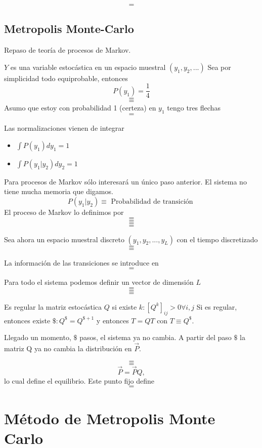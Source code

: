 \documentclass[10pt,oneside]{CBFT_book}
\begin{document}
\[=\]

\subsection{Metropolis Monte-Carlo}

Repaso de teoría de procesos de Markov.

$Y$ es una variable estocástica en un espacio muestral $(y_1, y_2,...)$
Sea por simplicidad todo equiprobable, entonces
\[
	P(y_1) = \frac{1}{4}
\]
\[=\]
\[=\]
Asumo que estoy con probabilidad 1 (certeza) en $y_1$ tengo tres flechas
\[ = \]

Las normalizaciones vienen de integrar
\begin{itemize}
 \item $ \int P(y_1) dy_1 = 1 $
 \item $ \int P(y_1|y_2) dy_2 = 1 $
\end{itemize}

Para procesos de Markov sólo interesará un único paso anterior. El sistema no tiene mucha memoria que 
digamos.
\[
	P(y_1|y_2) \equiv \text{ Probabilidad de transición }
\]
El proceso de Markov lo definimos por 
\[=\]
\[=\]
\[=\]
\[=\]

Sea ahora un espacio muestral discreto $(y_1,y_2,...,y_L)$ con el tiempo discretizado
\[=\]
\[=\]

La información de las transiciones se introduce en 
\[=\]

Para todo el sistema podemos definir un vector de dimensión $L$
\[=\]
\[=\]
\[=\]

Es regular la matriz estocástica $ Q $ si existe $ k : [ Q^k ]_{ij} > 0 \forall i,j $
Si es regular, entonces existe $ \$ : Q^\$ =  Q^{\$+1} $ y entonces $T = QT$ con $T\equiv Q^\$$.

Llegado un momento, $\$$ pasos, el sistema ya no cambia. A partir del paso $\$$ la matriz Q ya no cambia
la distribución en $\vec{P}$.


\[=\]
\[=\]
\[
	\vec{P} = \vec{P} Q,
\]
lo cual define el equilibrio. Este punto fijo define
\[ =\]

\section{Método de Metropolis Monte Carlo}
\end{document}
